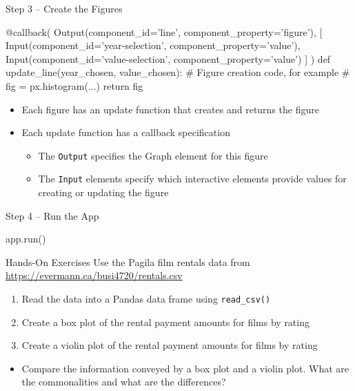 \documentclass[ignorenonframetext,xcolor=x11names]{beamer}
\begin{document}
\begin{frame}[fragile]{Step 3 -- Create the Figures}
\begin{pythoncode}
@callback(
    Output(component_id='line', component_property='figure'),
    [
        Input(component_id='year-selection', 
              component_property='value'),
        Input(component_id='value-selection', 
              component_property='value')
    ]
)
def update_line(year_chosen, value_chosen): 
    # Figure creation code, for example
    # fig = px.histogram(...)
    return fig
\end{pythoncode}
\footnotesize
\begin{itemize}
   \item Each figure has an update function that creates and returns the figure
   \item Each update function has a callback specification
   \begin{itemize}
   \footnotesize
      \item The \texttt{Output} specifies the Graph element for this figure
      \item The \texttt{Input} elements specify which interactive elements provide values for creating or updating the figure
   \end{itemize}
\end{itemize}
\end{frame}

\begin{frame}[fragile]{Step 4 -- Run the App}

\begin{pythoncode}
app.run()
\end{pythoncode}
\end{frame}

\begin{frame}{Hands-On Exercises}
\footnotesize
Use the Pagila film rentals data from \url{https://evermann.ca/busi4720/rentals.csv}
\begin{enumerate}
   \item Read the data into a Pandas data frame using \texttt{read\_csv()}
   \item Create a box plot of the rental payment amounts for films by rating
   \item Create a violin plot of the rental payment amounts for films by rating
\end{enumerate}
\begin{itemize}
\item Compare the information conveyed by a box plot and a violin plot. What are the commonalities and what are the differences?
\end{itemize}
\end{frame}
\end{document}
